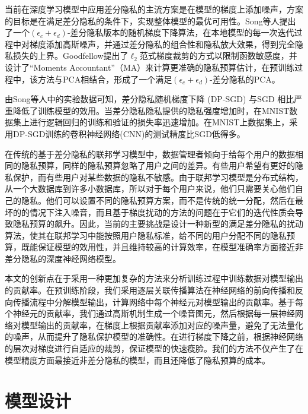 当前在深度学习模型中应用差分隐私的主流方案是在模型的梯度上添加噪声，方案的目标是在满足差分隐私的条件下，实现整体模型的最优可用性。Song等人提出了一个$\left(\epsilon_{c}+\epsilon_{d}\right)$-差分隐私版本的随机梯度下降算法，在本地模型的每一次迭代过程中对梯度添加高斯噪声，并通过差分隐私的组合性和隐私放大效果，得到完全隐私损失的上界。Goodfellow提出了$\ell_{2}$范式梯度裁剪的方式以限制函数敏感度，并设计了“Moments Accountant”（MA）来计算更准确的隐私预算估计，在预训练过程中，该方法与PCA相结合，形成了一个满足$\left(\epsilon_{c}+\epsilon_{d}\right)$-差分隐私的PCA。

由Song等人中的实验数据可知，差分隐私随机梯度下降 (DP-SGD) 与SGD 相比严重降低了训练模型的效用。当差分隐私隐私提供的隐私强度增加时，在MNIST数据集上进行逻辑回归的训练和验证的损失率迅速增加。在MNIST上数据集上，采用DP-SGD训练的卷积神经网络(CNN)的测试精度比SGD低得多。

在传统的基于差分隐私的联邦学习模型中，数据管理者倾向于给每个用户的数据相同的隐私预算，同样的隐私预算忽略了用户之间的差异。有些用户希望有更好的隐私保护，而有些用户对某些数据的隐私不敏感。由于联邦学习模型是分布式结构，从一个大数据库到许多小数据库，所以对于每个用户来说，他们只需要关心他们自己的隐私。他们可以设置不同的隐私预算方案，而不是传统的统一分配，然后在最坏的的情况下注入噪音，而且基于梯度扰动的方法的问题在于它们的迭代性质会导致隐私预算的飙升。因此，当前的主要挑战是设计一种新型的满足差分隐私的扰动算法，使其在联邦学习中能按照用户隐私标准，给不同的用户分配不同的隐私预算，既能保证模型的效用性，并且维持较高的计算效率，在模型准确率方面接近非差分隐私的深度神经网络模型。

本文的创新点在于采用一种更加复杂的方法来分析训练过程中训练数据对模型输出的贡献率。在预训练阶段，我们采用逐层关联传播算法在神经网络的前向传播和反向传播流程中分解模型输出，计算网络中每个神经元对模型输出的贡献率。基于每个神经元的贡献率，我们通过高斯机制生成一个噪音图元，然后根据每一层神经网络对模型输出的贡献率，在梯度上根据贡献率添加对应的噪声量，避免了无法量化的噪声，从而提升了隐私保护模型的准确性。在进行梯度下降之前，根据神经网络的层次对梯度进行自适应的裁剪，保证模型的快速瘦脸。我们的方法不仅产生了在模型精度方面最接近非差分隐私的模型，而且还降低了隐私预算的成本。

\section{模型设计}


